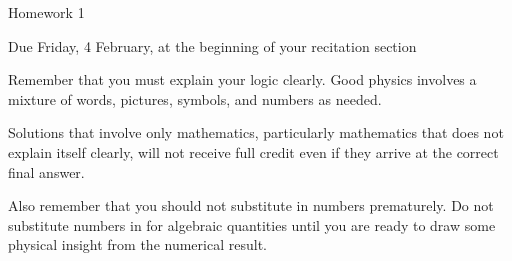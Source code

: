 \documentclass[12pt]{article}
\begin{document}
\begin{center}
\Large
\sc Homework 1 \rm


\normalsize

Due Friday, 4 February, at the beginning of your recitation section
\end{center}

Remember that you must explain your logic clearly. Good physics involves a mixture of words, pictures, symbols, and numbers as needed.


Solutions that involve
only mathematics, particularly mathematics that does not explain itself clearly, will not receive full credit even if they arrive at the correct final answer.

Also remember that you should not substitute in numbers prematurely. Do not substitute numbers in for algebraic quantities until you are ready to draw some physical insight from the numerical result.


\begin{center}
	
	\underline{\hspace{3in}}
\end{center}


\normalsize
\end{document}
